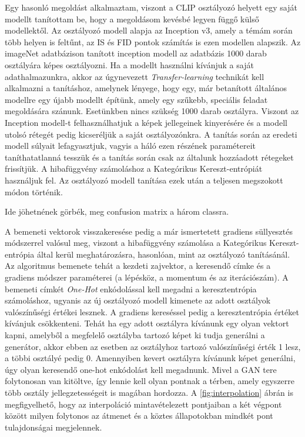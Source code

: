 Egy hasonló megoldást alkalmaztam, viszont a CLIP osztályozó helyett egy saját modellt tanítottam be, hogy a megoldásom kevésbé legyen függő külső modellektől. Az osztályozó modell alapja az Inception v3, amely a témám során több helyen is feltűnt, az IS és FID pontok számítás is ezen modellen alapszik. Az imageNet \cite{deng2009imagenet} adatbázison tanított inception modell az adatbázis 1000 darab osztályára képes osztályozni. Ha a modellt használni kívánjuk a saját adathalmazunkra, akkor az úgynevezett \textit{Transfer-learning} technikát kell alkalmazni a tanításhoz, amelynek lényege, hogy egy, már betanított általános modellre egy újabb modellt építünk, amely egy szűkebb, speciális feladat megoldására szánunk. Esetünkben nincs szükség 1000 darab osztályra. Viszont az Inception modell-t felhasználhatjuk a képek jellegeinek kinyerésére és a modell utolsó rétegét pedig kicseréljük a saját osztályozónkra.
A tanítás során az eredeti modell súlyait lefagyasztjuk, vagyis a háló ezen részének paramétereit taníthatatlanná tesszük és a tanítás során csak az általunk hozzáadott rétegeket frissítjük.
A hibafüggvény számoláshoz a Kategórikus Kereszt-entrópiát használjuk fel. Az osztályozó modell tanítása ezek után a teljesen megszokott módon történik.

Ide jöhetnének görbék, meg confusion matrix a három classra.

A bemeneti vektorok visszakeresése pedig a már ismertetett gradiens süllyesztés módszerrel valósul meg, viszont a hibafüggvény számolása a Kategórikus Kereszt-entrópia által kerül meghatározásra, hasonlóan, mint az osztályozó tanításánál. Az algoritmus bemenete tehát a kezdeti zajvektor, a keresendő címke és a gradiens módszer paraméterei (a lépésköz, a momentum és az iterációszám).
A bemeneti címkét \textit{One-Hot} enkódolással kell megadni a keresztentrópia számoláshoz, ugyanis az új osztályozó modell kimenete az adott osztályok valószínűségi értékei lesznek. A gradiens kereséssel pedig a keresztentrópia értéket kívánjuk csökkenteni. Tehát ha egy adott osztályra kívánunk egy olyan vektort kapni, amelyből a megfelelő osztályba tartozó képet ki tudja generálni a generátor, akkor ebben az esetben az osztályhoz tartozó valószínűségi érték 1 lesz, a többi osztályé pedig 0.
Amennyiben kevert osztályra kívánunk képet generálni, úgy olyan keresendő one-hot enkódolást kell megadnunk. Mivel a GAN tere folytonosan van kitöltve, így lennie kell olyan pontnak a térben, amely egyszerre több osztály jellegzetességeit is magában hordozza. A \ref{fig:interpolation} ábrán is megfigyelhető, hogy az interpoláció mintavételezett pontjaiban a két végpont között milyen folytonos az átmenet és a köztes állapotokban mindkét pont tulajdonságai megjelennek.

